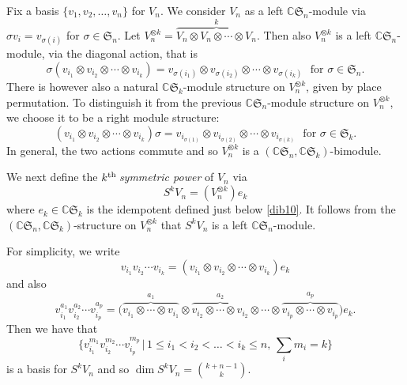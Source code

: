 \documentclass[10pt,hidelinks]{article}
\newcommand{\CC}{ \mathbb C }
\newcommand{\Si}{\mathfrak{S}}
\numberwithin{equation}{section}
\begin{document}
\medskip
Fix a basis $ \{ v_1, v_2, \ldots, v_n \} $ for $ V_n$. We consider $ V_n $ as a left $ \CC \Si_n $-module
via $ \sigma v_i = v_{ \sigma(i)} $ for $ \sigma \in \Si_n $.
Let $ V_n^{\otimes k } =\overbrace{V_n \otimes V_n \otimes \cdots \otimes V_n}^k$.
Then also $ V_n^{\otimes k } $ is a left $\CC \Si_n $-module, via the diagonal action, that is
\begin{equation} \sigma(v_{i_1} \otimes v_{i_2} \otimes \cdots \otimes  v_{i_k} ) = 
v_{ \sigma(i_1)} \otimes v_{\sigma(i_2)} \otimes \cdots \otimes  v_{\sigma(i_k)} \, \, \mbox{ for } \sigma \in \Si_n. 
\end{equation}
There is however also a natural $\CC \Si_k $-module structure on $V_n^{\otimes k } $, given by place permutation.
To distinguish it from the previous $\CC \Si_n $-module structure on $V_n^{\otimes k } $,
we choose it to be a right module structure:
\begin{equation} (v_{i_1} \otimes v_{i_2} \otimes \cdots \otimes  v_{i_k} )\sigma = 
v_{i_{\sigma(1)}} \otimes v_{i_{\sigma(2)}} \otimes \cdots \otimes  v_{i_{\sigma(k)}} \, \, \mbox{ for } \sigma \in \Si_k. 
\end{equation}
In general, the two actions commute and so $V_n^{\otimes k } $ is a
$ (\CC \Si_n, \CC \Si_k) $-bimodule. 

\medskip
We next define the {\it $k^{\color{black} \rm th} \,$symmetric power} of $ V_n$ via
\begin{equation}
S^k V_n= ( V_n^{\otimes k })e_k
\end{equation}
where $ e_k \in \CC \Si_k $ is the idempotent defined just below \eqref{dib10}.
It follows from the $ (\CC \Si_n, \CC \Si_k) $-structure on
$  V_n^{\otimes k} $ 
that $ S^k V_n $ is a left $ \CC \Si_n$-module. 

\medskip
For simplicity, we write
\begin{equation}
v_{i_1} v_{i_2} \cdots v_{i_k} = (v_{i_1} \otimes v_{i_2} \otimes  \cdots \otimes v_{i_k}) e_k 
\end{equation}
and also
\begin{equation}
  v_{i_1}^{a_1} v_{i_2}^{a_2} \cdots v_{i_p}^{a_p} =
  \bigg(    \overbrace{ v_{i_1} \otimes \cdots \otimes v_{i_1}}^{a_1 } \otimes
  \overbrace{ v_{i_2} \otimes \cdots \otimes v_{i_2}}^{a_2 }\otimes \cdots \otimes 
  \overbrace{ v_{i_p} \otimes \cdots \otimes v_{i_p}}^{a_p }
  \bigg) e_k .
\end{equation}
Then we have that
\begin{equation}\label{basis}
  \{   v_{i_1}^{m_1} v_{i_2}^{m_2} \cdots v_{i_p}^{m_p}  \, |\, 1 \le i_1 < i_2 < \ldots < i_k \le n, \,  \sum_i  m_i = k  \}
\end{equation}
is a basis for $ S^k V_n $ and so $ \dim  S^k V_n = \binom{k+n-1}{k} $.
\end{document}
